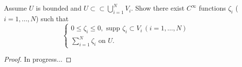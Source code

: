 \documentclass[11pt]{article}
\begin{document}
\subsection{}
Assume $U$ is bounded and $U \subset\subset \bigcup_{i=1}^{N}V_i$. Show there exist $C^{\infty}$ functions $\zeta_i$ ($i=1,\dots,N$)
such that
\[
\begin{cases}
	0 \leq \zeta_i \leq 0, \text{ supp } \zeta_i \subset V_i \,(i=1,\dots,N)\\
	\sum_{i=1}^{N} \zeta_i \text{ on } U.
\end{cases}
\]
\begin{proof}
In progress...
\end{proof}
\end{document}
